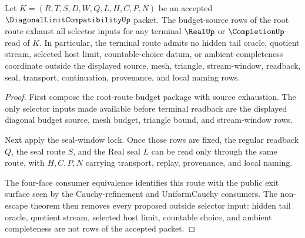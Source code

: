 \begin{theorem}
\label{thm:diagonal-limit-compatibility-root-route-budget-source-totality}
Let $K=(R,T,S,D,W,Q,L,H,C,P,N)$ be an accepted $\DiagonalLimitCompatibilityUp$ packet. The budget-source rows of the root route exhaust all selector inputs for any terminal $\RealUp$ or $\CompletionUp$ read of $K$. In particular, the terminal route admits no hidden tail oracle, quotient stream, selected host limit, countable-choice datum, or ambient-completeness coordinate outside the displayed source, mesh, triangle, stream-window, readback, seal, transport, continuation, provenance, and local naming rows.
\end{theorem}
\begin{proof}
First compose the root-route budget package with source exhaustion. The only selector inputs made available before terminal readback are the displayed diagonal budget source, mesh budget, triangle bound, and stream-window rows.

Next apply the seal-window lock. Once those rows are fixed, the regular readback $Q$, the seal route $S$, and the Real seal $L$ can be read only through the same route, with $H,C,P,N$ carrying transport, replay, provenance, and local naming.

The four-face consumer equivalence identifies this route with the public exit surface seen by the Cauchy-refinement and UniformCauchy consumers. The non-escape theorem then removes every proposed outside selector input: hidden tail oracle, quotient stream, selected host limit, countable choice, and ambient completeness are not rows of the accepted packet.
\end{proof}
